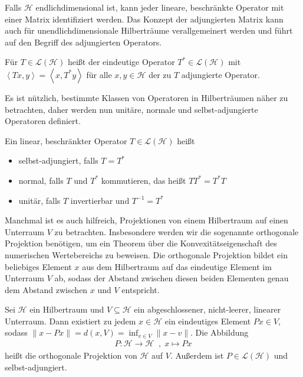 Falls $\mathcal{H}$ endlichdimensional ist, kann jeder lineare, beschränkte Operator mit einer Matrix identifiziert werden. Das Konzept der adjungierten Matrix kann auch für unendlichdimensionale Hilberträume verallgemeinert werden und führt auf den Begriff des adjungierten Operators.

\begin{definition}
    Für $T\in \mathcal{L}(\mathcal{H})$ heißt der eindeutige Operator $T^*\in \mathcal{L}(\mathcal{H})$ mit $\left< Tx,y \right> = \left< x,T^*y \right>$ für alle $x, y \in \mathcal{H}$ der zu $T$ adjungierte Operator.  
\end{definition}

Es ist nützlich, bestimmte Klassen von Operatoren in Hilberträumen näher zu betrachten, daher werden nun unitäre, normale und selbst-adjungierte Operatoren definiert.

\begin{definition}
    Ein linear, beschränkter Operator $T \in \mathcal{L}(\mathcal{H})$ heißt
    \begin{itemize}
        \item selbst-adjungiert, falls $T=T^*$
        \item normal, falls $T$ und $T^*$ kommutieren, das heißt $TT^*=T^*T$
        \item unitär, falls $T$ invertierbar und $T^{-1}=T^*$
    \end{itemize}
\end{definition}

Manchmal ist es auch hilfreich, Projektionen von einem Hilbertraum auf einen Unterraum $V$ zu betrachten. Insbesondere werden wir die sogenannte orthogonale Projektion benötigen, um ein Theorem über die Konvexitätseigenschaft des numerischen Wertebereichs zu beweisen. Die orthogonale Projektion bildet ein beliebiges Element $x$ aus dem Hilbertraum auf das eindeutige Element im Unterraum $V$ ab, sodass der Abstand zwischen diesen beiden Elementen genau dem Abstand zwischen $x$ und $V$ entspricht. 

\begin{thm} \label{thm_orth_proj}
    Sei $\mathcal{H}$ ein Hilbertraum und $V \subseteq \mathcal{H}$ ein abgeschlossener, nicht-leerer, linearer Unterraum. Dann existiert zu jedem $x \in \mathcal{H}$ ein eindeutiges Element $Px \in V$, sodass $\|x-Px\|=d(x, V)= \inf_{v\in V} \|x-v\|$. Die Abbildung \begin{align*}
        P: \mathcal{H} \longrightarrow \mathcal{H} \; \; , \; x \mapsto Px
    \end{align*}
    heißt die orthogonale Projektion von $\mathcal{H}$ auf $V$. Außerdem ist $P \in \mathcal{L}(\mathcal{H})$ und selbst-adjungiert. 
\end{thm}


